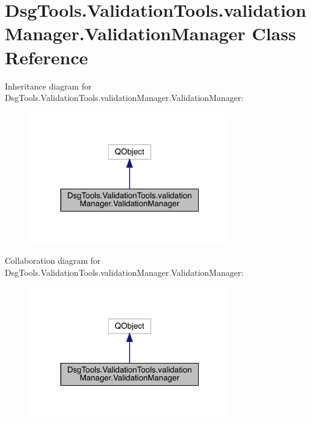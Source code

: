 \hypertarget{class_dsg_tools_1_1_validation_tools_1_1validation_manager_1_1_validation_manager}{}\section{Dsg\+Tools.\+Validation\+Tools.\+validation\+Manager.\+Validation\+Manager Class Reference}
\label{class_dsg_tools_1_1_validation_tools_1_1validation_manager_1_1_validation_manager}


Inheritance diagram for Dsg\+Tools.\+Validation\+Tools.\+validation\+Manager.\+Validation\+Manager\+:
\nopagebreak
\begin{figure}[H]
\begin{center}
\leavevmode
\includegraphics[width=251pt]{class_dsg_tools_1_1_validation_tools_1_1validation_manager_1_1_validation_manager__inherit__graph}
\end{center}
\end{figure}


Collaboration diagram for Dsg\+Tools.\+Validation\+Tools.\+validation\+Manager.\+Validation\+Manager\+:
\nopagebreak
\begin{figure}[H]
\begin{center}
\leavevmode
\includegraphics[width=251pt]{class_dsg_tools_1_1_validation_tools_1_1validation_manager_1_1_validation_manager__coll__graph}
\end{center}
\end{figure}
